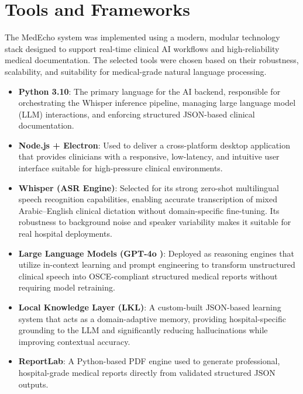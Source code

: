 


\section{Tools and Frameworks}
\label{sec:impl:tools}
The MedEcho system was implemented using a modern, modular technology stack designed to support real-time clinical AI workflows and high-reliability medical documentation. The selected tools were chosen based on their robustness, scalability, and suitability for medical-grade natural language processing.

\begin{itemize}
    \item \textbf{Python 3.10}: The primary language for the AI backend, responsible for orchestrating the Whisper inference pipeline, managing large language model (LLM) interactions, and enforcing structured JSON-based clinical documentation.

    \item \textbf{Node.js + Electron}: Used to deliver a cross-platform desktop application that provides clinicians with a responsive, low-latency, and intuitive user interface suitable for high-pressure clinical environments.

    \item \textbf{Whisper (ASR Engine)}: Selected for its strong zero-shot multilingual speech recognition capabilities, enabling accurate transcription of mixed Arabic–English clinical dictation without domain-specific fine-tuning. Its robustness to background noise and speaker variability makes it suitable for real hospital deployments.

    \item \textbf{Large Language Models (GPT-4o )}: Deployed as reasoning engines that utilize in-context learning and prompt engineering to transform unstructured clinical speech into OSCE-compliant structured medical reports without requiring model retraining.

    \item \textbf{Local Knowledge Layer (LKL)}: A custom-built JSON-based learning system that acts as a domain-adaptive memory, providing hospital-specific grounding to the LLM and significantly reducing hallucinations while improving contextual accuracy.

    \item \textbf{ReportLab}: A Python-based PDF engine used to generate professional, hospital-grade medical reports directly from validated structured JSON outputs.
\end{itemize}

